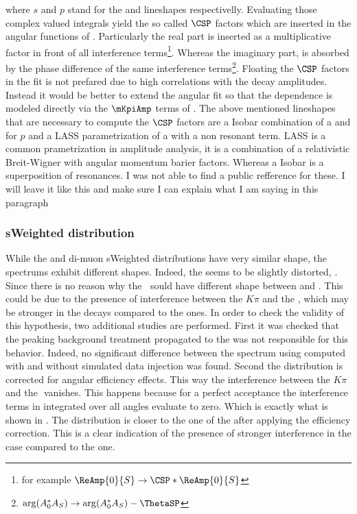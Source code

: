 \noindent where $s$ and $p$ stand for the \swave and \pwave lineshapes respectivelly. Evaluating those complex valued integrals yield 
the so called $\CSP$ factors which are inserted in the angular functions of . Particularly the real part is inserted
as a multiplicative factor in front of all \spwave interference
terms\footnote{for example $\ReAmp{0}{S} \rightarrow \CSP * \ReAmp{0}{S} $}.
Whereas the imaginary part, is absorbed by the phase difference of the same interference 
terms\footnote{ $\arg(A_0^*A_S) \rightarrow \arg(A_0^*A_S) - \ThetaSP$}. Floating the $\CSP$ factors in the fit is not prefared due
to high correlations with the decay amplitudes. Instead it would be better to extend the angular fit so that the \mkpi dependence 
is modeled directly via the $\mKpiAmp$ terms of . The above mentioned \swave lineshapes that are necessary
to compute the $\CSP$ factors are a Isobar combination of a \KstENT and \KstOFOZ for $p$ and a LASS parametrization of a \KstOFTZ
with a non resonant term. LASS is a common \swave prametrization in amplitude analysis, it is a combination of a relativistic Breit-Wigner
with angular momentum barier factors. Whereas a Isobar is a superposition of resonances. {\color{red}I was not able to find a public refference for these. I
 will leave it like this and make sure I can explain what I am saying in this paragraph }


\subsubsection{sWeighted \mkpi distribution}
While the \Bs and \Bd di-muon sWeighted distributions have very similar shape, the \mkpi spectrums exhibit different shapes. 
Indeed, the \Bs \mkpi \sPlot seems to be slightly distorted, . Since there is no reason why the \Kst$~$\pwave 
sould have different shape between \BsJpsiKst and \BdJpsiKst. This could be due to the presence of interference between
the $K\pi$ \swave and the \Kstarz, which may be stronger in the \Bs decays compared to the \Bd ones. In order 
to check the validity of this hypothesis, two additional studies are performed. First it was checked that the peaking
background treatment propagated to the \sWeights was not responsible for this behavior. Indeed, no significant difference 
between the \Bs \mkpi spectrum using \sWeights computed with and without simulated data injection was found. Second the \mkpi 
distribution is corrected for angular efficiency effects. This way the interference between the $K\pi$ \swave and the 
\Kstarz $ $ \pwave vanishes. This happens because for a perfect acceptance the interference terms in  integrated over all angles
evaluate to zero. Which is exactly what is shown in . The \Bs \mkpi distribution is closer to the one of the \Bd after applying
the efficiency correction. This is a clear indication of the presence of stronger interference in the \Bs case compared to the \Bd one.

